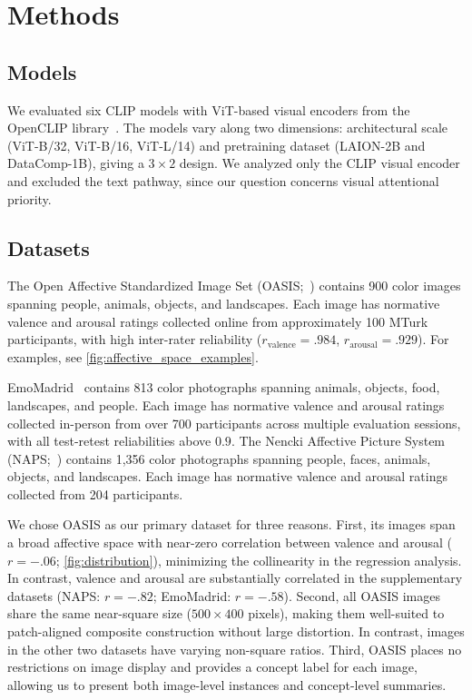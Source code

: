 \documentclass{article}
\begin{document}
\section{Methods}

\subsection{Models}

We evaluated six CLIP models with ViT-based visual encoders from the OpenCLIP
library~\citep{cherti2023reproducible, ilharco_gabriel_openclip_repo}.
The models vary along two dimensions: architectural scale (ViT-B/32, ViT-B/16, ViT-L/14) and pretraining dataset 
(LAION-2B and DataComp-1B), 
giving a $3 \times 2$ design. 
We analyzed only the CLIP visual encoder and excluded the text pathway, since our question concerns visual attentional priority.


\subsection{Datasets}
The Open Affective Standardized Image Set
(OASIS;~\citep{kurdiIntroducingOpenAffective2017}) contains 900 color images
spanning people, animals, objects, and landscapes. Each image has normative
valence and arousal ratings collected online from approximately 100 MTurk
participants, with high inter-rater reliability
($r_\text{valence} = .984$, $r_\text{arousal} = .929$). For examples, see \cref{fig:affective_space_examples}. 

EmoMadrid~\citep{carretieEmoMadridEmotionalPictures2019} contains 813
color photographs spanning animals, objects, food, landscapes, and people.
Each image has normative valence and arousal ratings collected in-person from over 700
participants across multiple evaluation sessions, with all test-retest
reliabilities above $0.9$.
The Nencki Affective Picture System
(NAPS;~\citealt{marchewkaNAPSIntroduction2014}) contains 1,356 color
photographs spanning people, faces, animals, objects, and landscapes. Each image has
normative valence and arousal ratings collected from 204 participants.

We chose OASIS as our primary dataset for three reasons. 
First, its images span a broad affective space with near-zero correlation between valence and arousal ($r = -.06$; \cref{fig:distribution}), minimizing the collinearity in the
regression analysis. 
In contrast, valence and arousal are substantially
correlated in the supplementary datasets (NAPS: $r = -.82$; EmoMadrid:
$r = -.58$). 
Second, all OASIS images share the same near-square size
($500 \times 400$ pixels), making them well-suited to patch-aligned composite construction without large distortion. 
In contrast, images in the other two datasets have varying non-square ratios. 
Third, OASIS places no restrictions on image display and provides a concept label for each image, allowing us to present both image-level instances and concept-level summaries.
\end{document}
